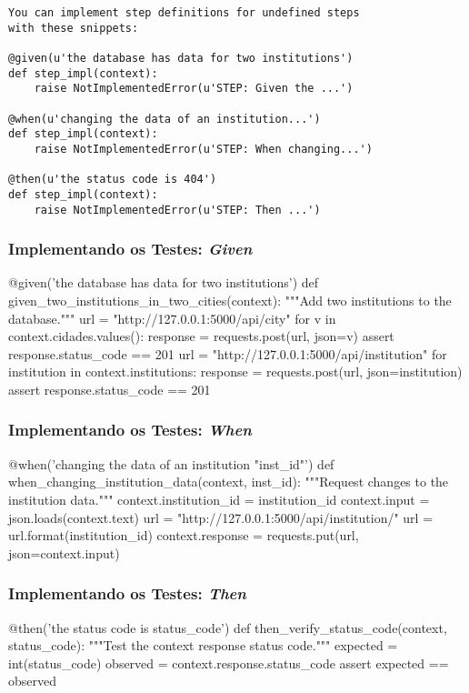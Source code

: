 {%
\usebackgroundtemplate{}%
\begin{frame}[fragile]
\color{orange}
\begin{verbatim}
You can implement step definitions for undefined steps
with these snippets:

@given(u'the database has data for two institutions')
def step_impl(context):
    raise NotImplementedError(u'STEP: Given the ...')

@when(u'changing the data of an institution...')
def step_impl(context):
    raise NotImplementedError(u'STEP: When changing...')

@then(u'the status code is 404')
def step_impl(context):
    raise NotImplementedError(u'STEP: Then ...')            
\end{verbatim}
\end{frame}
}

{%
\usebackgroundtemplate{}%
\begin{frame}[fragile]
    \frametitle{Implementando os Testes: \textit{Given}}
    \begin{python}
@given('the database has data for two institutions')
def given_two_institutions_in_two_cities(context):
    """Add two institutions to the database."""
    url = "http://127.0.0.1:5000/api/city"
    for v in context.cidades.values():
        response = requests.post(url, json=v)
        assert response.status_code == 201
    url = "http://127.0.0.1:5000/api/institution"
    for institution in context.institutions:
        response = requests.post(url, json=institution)
        assert response.status_code == 201
    \end{python}
\end{frame}
}

{%
\usebackgroundtemplate{}%
\begin{frame}[fragile]
    \frametitle{Implementando os Testes: \textit{When}}
    \begin{python}
@when('changing the data of an institution "{inst_id}"')
def when_changing_institution_data(context, inst_id):
    """Request changes to the institution data."""
    context.institution_id = institution_id
    context.input = json.loads(context.text)
    url = "http://127.0.0.1:5000/api/institution/{}"
    url = url.format(institution_id)
    context.response = requests.put(url,
                                    json=context.input)
\end{python}
\end{frame}
}

{%
\usebackgroundtemplate{}%
\begin{frame}[fragile]
    \frametitle{Implementando os Testes: \textit{Then}}
    \begin{python}
@then('the status code is {status_code}')
def then_verify_status_code(context, status_code):
    """Test the context response status code."""
    expected = int(status_code)
    observed = context.response.status_code
    assert expected == observed 
    \end{python}
\end{frame}
}

